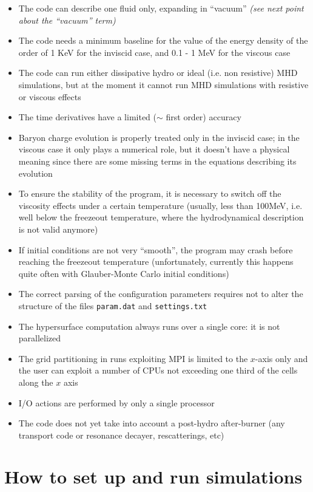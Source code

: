 \begin{itemize}

\item The code can describe one fluid only, expanding in ``vacuum'' \emph{(see next point about the ``vacuum'' term)}
\item{The code needs a minimum baseline for the value of the energy density of the order of 1 KeV for the inviscid case, and 0.1 - 1 MeV for the viscous case}
\item The code can run either dissipative hydro or ideal (i.e. non resistive) MHD simulations, but at the moment it cannot run MHD simulations with resistive or viscous effects
\item{The time derivatives have a limited ($\sim$ first order) accuracy}
\item{Baryon charge evolution is properly treated only in the inviscid case; in the viscous case it only plays a numerical role, but it doesn't have a physical meaning since there are some missing terms in the equations describing its evolution}
\item{To ensure the stability of the program, it is necessary to switch off the viscosity effects under a certain temperature (usually, less than 100MeV, i.e. well below the freezeout temperature, where the hydrodynamical description is not valid anymore)}
\item{If initial conditions are not very ``smooth'', the program may crash before reaching the freezeout temperature (unfortunately, currently this happens quite often with Glauber-Monte Carlo initial conditions)}
\item{The correct parsing of the configuration parameters requires not to alter the structure of the files {\tt param.dat} and {\tt settings.txt}}
\item{The hypersurface computation always runs over a single core: it is not parallelized}
\item{The grid partitioning in runs exploiting MPI is limited to the $x$-axis only and the user can exploit a number of CPUs not exceeding one third of the cells along the $x$ axis}
\item{I/O actions are performed by only a single processor}
\item{The code does not yet take into account a post-hydro after-burner (any transport code or resonance decayer, rescatterings, etc)}
\end{itemize}


\chapter{How to set up and run simulations}
